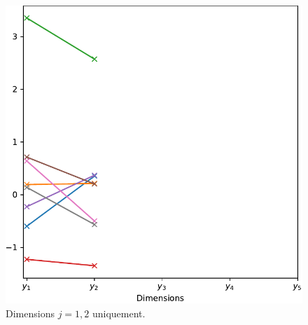 \documentclass[xcolor=svgnames, t]{beamer}
\begin{document}
\begin{frame}
\begin{figure}[ht]
    \includegraphics[scale=0.3]{gaussian_2d_valuevsindex.pdf}
    \caption{Dimensions $j=1, 2$ uniquement.}
  \end{figure}
\end{frame}
\end{document}
